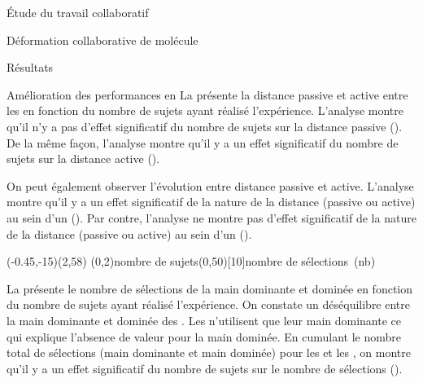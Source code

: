 \documentclass[myfrancais]{mythesis}
\begin{document}
\begin{mypart}{Étude du travail collaboratif}
\begin{mychapter}{Déformation collaborative de molécule}
\begin{mysection}{Résultats}
\begin{mysubsection}{Amélioration des performances en }
					La  présente la distance passive  et active  entre les  en fonction du nombre de sujets  ayant réalisé l'expérience.
					L'analyse montre qu'il n'y a pas d'effet significatif du nombre de sujets  sur la distance passive  ().
					De la même façon, l'analyse montre qu'il y a un effet significatif du nombre de sujets  sur la distance active  ().

					On peut également observer l'évolution entre distance passive et active.
					L'analyse montre qu'il y a un effet significatif de la nature de la distance (passive ou active) au sein d'un  ().
					Par contre, l'analyse ne montre pas d'effet significatif de la nature de la distance (passive ou active) au sein d'un  ().

					\begin{myfigure}
						\begin{myps}(-0.45,-15)(2,58)
							\myaxes(0,2){nombre de sujets}(0,50)[10]{nombre de sélections~(nb)}
						\end{myps}
					\end{myfigure}

					La  présente le nombre de sélections de la main dominante et dominée  en fonction du nombre de sujets  ayant réalisé l'expérience.
					On constate un déséquilibre entre la main dominante et dominée des .
					Les  n'utilisent que leur main dominante ce qui explique l'absence de valeur pour la main dominée.
					En cumulant le nombre total de sélections (main dominante et main dominée) pour les  et les , on montre qu'il y a un effet significatif du nombre de sujets  sur le nombre de sélections  ().


\end{mysubsection}
\end{mysection}
\end{mychapter}
\end{mypart}
\end{document}
